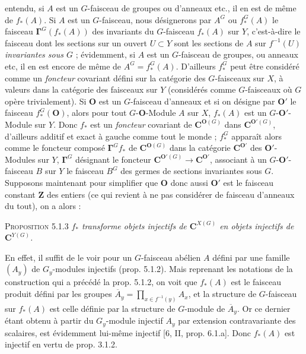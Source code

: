 \clearpage
{}

entendu, si $A$ est un $G$-faisceau de groupes ou d'anneaux etc., il en est de
même de $f_*(A)$.
Si $A$ est un $G$-faisceau, nous désignerons par $A^G$ ou $f_*^G(A)$ le
faisceau $\mathbf{\Gamma}^G(f_*(A))$ des invariants du $G$-faisceau $f_*(A)$ sur $Y$,
c'est-à-dire le faisceau dont les sections sur un ouvert $U\subset Y$ sont les
sections de $A$ sur $f^{-1}(U)$ \textit{invariantes sous $G$} ; évidemment, si $A$ est
un $G$-faisceau de groupes, ou anneaux etc, il en est encore de même de
$A^G=f_*^G(A)$.
D'ailleurs $f_*^G$ peut être considéré comme un \textit{foncteur} covariant
défini sur la catégorie des $G$-faisceaux sur $X$, à valeurs dans la catégorie
des faisceaux sur $Y$ (considérés comme $G$-faisceaux où $G$ opère
trivialement). Si ${\mathbf O}$ est un $G$-faisceau d'anneaux et si on désigne par ${\mathbf O}'$
le faisceau $f_*^G({\mathbf O})$, alors pour tout $G$-${\mathbf O}$-Module $A$ sur $X$, $f_*(A)$
est un $G$-${\mathbf O}'$-Module sur $Y$. Donc $f_*$ est un \textit{foncteur} covariant
de ${\mathbf C}^{{\mathbf O}(G)}$ dans ${\mathbf C}^{{\mathbf O}'(G)}$, d'ailleurs additif et exact à gauche comme
tout le monde ; $f_*^G$ apparaît alors comme le foncteur composé
$\mathbf{\Gamma}^Gf_*$ de ${\mathbf C}^{{\mathbf O}(G)}$ dans la catégorie ${\mathbf C}^{{\mathbf O}'}$ des ${\mathbf O}'$-Modules sur
$Y$, $\mathbf{\Gamma}^G$ désignant le foncteur
${\mathbf C}^{{\mathbf O}'(G)}\to {\mathbf C}^{{\mathbf O}'}$, associant à un $G$-${\mathbf O}'$-faisceau $B$ sur
$Y$ le faisceau $B^G$ des germes de sections invariantes sous $G$. Supposons
maintenant pour simplifier que ${\mathbf O}$ donc aussi ${\mathbf O}'$ est le faisceau constant
$\mathbf Z$ des entiers (ce qui revient à ne pas considérer de faisceau
d'anneaux du tout), on a alors :

\textsc{Proposition 5.1.3} \textit{$f_*$ transforme objets injectifs
de ${\mathbf C}^{X(G)}$ en objets injectifs de ${\mathbf C}^{Y(G)}$.}

En effet, il suffit de le voir pour un $G$-faisceau abélien $A$ défini par une
famille $(A_y)$ de $G_y$-modules injectifs (prop. 5.1.2). Mais reprenant les
notations de la construction qui a précédé la prop. 5.1.2, on voit que
$f_*(A)$ est le faisceau produit défini par les groupes $\overline A_y=\displaystyle\prod_{x\in f^{-1}(y)}A_x$,
et la structure de $G$-faisceau sur $f_*(A)$ est celle définie par la structure
de $G$-module de $\overline A_y$. Or ce dernier étant obtenu à partir du
$G_y$-module injectif $A_y$ par extension contravariante des scalaires, est
évidemment lui-même injectif [6, II, prop. 6.1.a]. Donc $f_*(A)$ est injectif
en vertu de prop. 3.1.2.

